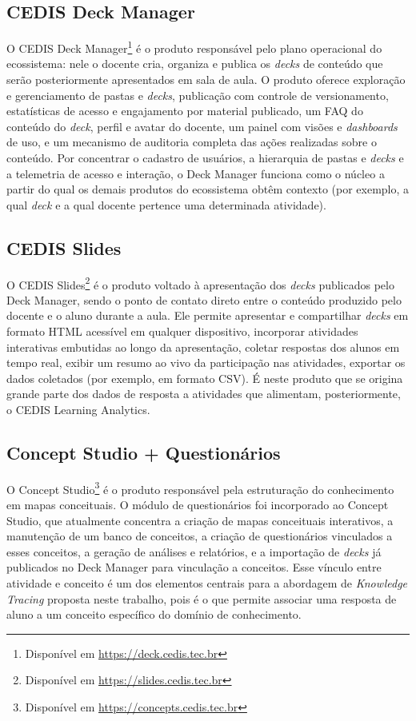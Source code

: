 \subsection{CEDIS Deck Manager}
\label{subsec:deck-manager}

O CEDIS Deck Manager\footnote{Disponível em \url{https://deck.cedis.tec.br}} é o produto
responsável pelo plano operacional do ecossistema: nele o docente cria,
organiza e publica os \textit{decks} de conteúdo que serão posteriormente
apresentados em sala de aula. O produto oferece exploração e gerenciamento
de pastas e \textit{decks}, publicação com controle de versionamento,
estatísticas de acesso e engajamento por material publicado, um FAQ do
conteúdo do \textit{deck}, perfil e avatar do docente, um painel com
visões e \textit{dashboards} de uso, e um mecanismo de auditoria completa
das ações realizadas sobre o conteúdo. Por concentrar o cadastro de
usuários, a hierarquia de pastas e \textit{decks} e a telemetria de acesso
e interação, o Deck Manager funciona como o núcleo a partir do qual os
demais produtos do ecossistema obtêm contexto (por exemplo, a qual
\textit{deck} e a qual docente pertence uma determinada atividade).

\subsection{CEDIS Slides}
\label{subsec:slides}

O CEDIS Slides\footnote{Disponível em \url{https://slides.cedis.tec.br}} é o produto voltado à
apresentação dos \textit{decks} publicados pelo Deck Manager, sendo o
ponto de contato direto entre o conteúdo produzido pelo docente e o aluno
durante a aula. Ele permite apresentar e compartilhar \textit{decks} em
formato HTML acessível em qualquer dispositivo, incorporar atividades
interativas embutidas ao longo da apresentação, coletar respostas dos
alunos em tempo real, exibir um resumo ao vivo da participação nas atividades,
exportar os dados coletados (por exemplo, em formato CSV). É neste
produto que se origina grande parte dos dados de resposta a atividades
que alimentam, posteriormente, o CEDIS Learning Analytics.

\subsection{Concept Studio + Questionários}
\label{subsec:concept-studio}

O Concept Studio\footnote{Disponível em \url{https://concepts.cedis.tec.br}} é o produto
responsável pela estruturação do conhecimento em mapas conceituais.
O módulo de questionários foi incorporado ao Concept Studio, que 
atualmente concentra a criação de mapas conceituais interativos, a
manutenção de um banco de conceitos, a criação de questionários vinculados
a esses conceitos, a geração de análises e relatórios, e a importação de
\textit{decks} já publicados no Deck Manager para vinculação a conceitos.
Esse vínculo entre atividade e conceito é um dos elementos centrais para a
abordagem de \textit{Knowledge Tracing} proposta neste trabalho, pois é o
que permite associar uma resposta de aluno a um conceito específico do domínio
de conhecimento.


